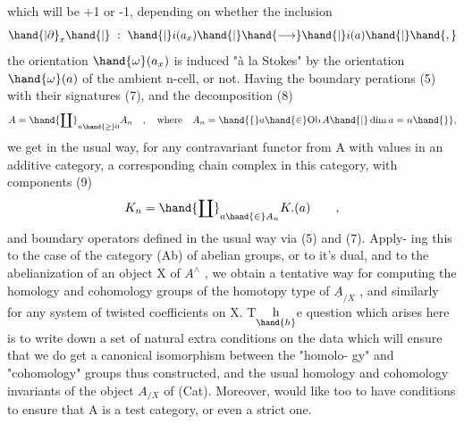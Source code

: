 which will be +1 or -1, depending on whether  the inclusion
\[ \hand{|\partial}_x\hand{|} \ : \ \hand{|}i(a_x)\hand{|} \hand{\longrightarrow} \hand{|}i(a)\hand{|}\hand{,} \]
the orientation $\hand{\omega}(a_x)$ is induced "à la Stokes" by the orientation $\hand{\omega}(a)$
of the ambient n-cell, or not. Having the boundary perations (5)
with their signatures (7),  and the decomposition
(8) \[ A = \hand{\coprod}_{n \hand{\geq} 0} A_n \quad , \quad \text{where} \quad A_n = \hand{\{} a \hand{\in} \mathrm{Ob}\, A \hand{|} \dim a = n \hand{\}}, \]
we get in the usual way, for any contravariant functor  from A with
values in an additive category, a corresponding
chain complex in this category, with components
(9) \[ K_n = \hand{\coprod}_{a \hand{\in} A_n} K.(a) \qquad , \]
and boundary operators defined in the usual way via (5) and (7). Apply-%
ing this to the case of the category (Ab) of abelian groups, or to it's
dual,  and to the abelianization of an object X of $A^{\wedge}$ , we obtain
a tentative way for computing the homology and cohomology groups of
the homotopy type of $\underline{A}_{/X}$ , and similarly for any system of twisted
coefficients on X. T\(\underset{\hand{h}}{\text{h}}\)e question which arises here is to write down
 a set of natural extra conditions on the data\hand{,}  which 
will ensure that we do get a canonical isomorphism between the "homolo-%
gy" and "cohomology" groups thus constructed, and the usual homology
and cohomology invariants of the object $A_{/X}$ of (Cat). Moreover, 
would like too to have conditions to ensure that A is a test category,
or even a strict one.

